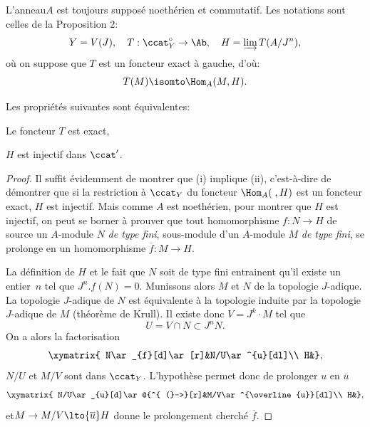 L'anneau\pageoriginale $A$ est toujours suppos\'e noeth\'erien et commutatif. Les notations sont celles de la Proposition 2:
\begin{equation*} Y=V(J), \quad T:\ccat_{Y}^{\circ}\to \Ab, \quad H=\varinjlim T(A/J^{n}),
\end{equation*}
o\`u on suppose que $T$ est un foncteur exact \`a gauche, d'o\`u:
\begin{equation*} T(M)\isomto \Hom_{A}(M, H).
\end{equation*}

\begin{proposition} \label{IV.2.1}
Les propri\'et\'es suivantes sont \'equivalentes:
\begin{enumeratei}
\item
Le foncteur $T$ est exact,

\item
$H$ est injectif dans $\ccat'$.
\end{enumeratei}
\end{proposition}

\begin{proof}
Il suffit \'evidemment de montrer que (i) implique (ii), c'est-\`a-dire de d\'emontrer que si la restriction \`a $\ccat_{Y}$ du foncteur $\Hom_{A}(\;, H)$ est un foncteur exact, $H$ est injectif. Mais comme $A$ est noeth\'erien, pour montrer que $H$ est injectif, on peut se borner \`a prouver que tout homomorphisme $f:N\to H$ de source un $A$-module $N$ \emph{de type fini}, sous-module d'un $A$-module $M$ \emph{de type fini}, se prolonge en un homomorphisme $\overline{f}:M\to H$.

La d\'efinition de $H$ et le fait que $N$ soit de type fini entrainent qu'il existe un entier~$n$ tel que $J^{n}.f(N)=0$. Munissons alors $M$ et $N$ de la topologie $J$-adique. La topologie $J$-adique de $N$ est \'equivalente \`a la topologie induite par la topologie $J$-adique de $M$ (th\'eor\`eme de Krull). Il existe donc $V=J^{k}\cdot M$ tel que
\begin{equation*} U=V\cap N\subset J^{n}N.
\end{equation*}
On a alors la factorisation
$$
\xymatrix{ N\ar_{f}[d]\ar[r]&N/U\ar^{u}[dl]\\
H&},
$$
$N/U$ et $M/V$ sont dans $\ccat_{Y}$. L'hypoth\`ese permet donc de prolonger $u$ en $\overline{u}$
$$
\xymatrix{ N/U\ar_{u}[d]\ar@{^{ (}->}[r]&M/V\ar^{\overline{u}}[dl]\\
H&},
$$
et\pageoriginale $M\to M/V\lto{\overline{u}} H$ donne le prolongement cherch\'e $\overline{f}$.
\skipqed
\end{proof}

